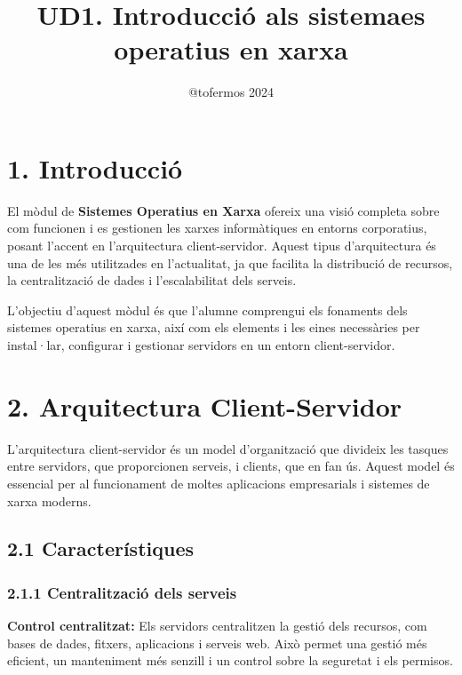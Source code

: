 \documentclass[
  a4paper,
]{article}
\title{UD1. Introducció als sistemaes operatius en xarxa}
\author{@tofermos 2024}
\date{}
\begin{document}
\maketitle

{
\setcounter{tocdepth}{2}
\tableofcontents
}
\newpage
\renewcommand\tablename{Tabla}

\section{1. Introducció}\label{introducciuxf3}

El mòdul de \textbf{Sistemes Operatius en Xarxa} ofereix una visió
completa sobre com funcionen i es gestionen les xarxes informàtiques en
entorns corporatius, posant l'accent en l'arquitectura client-servidor.
Aquest tipus d'arquitectura és una de les més utilitzades en
l'actualitat, ja que facilita la distribució de recursos, la
centralització de dades i l'escalabilitat dels serveis.

L'objectiu d'aquest mòdul és que l'alumne comprengui els fonaments dels
sistemes operatius en xarxa, així com els elements i les eines
necessàries per instal·lar, configurar i gestionar servidors en un
entorn client-servidor.

\section{2. Arquitectura
Client-Servidor}\label{arquitectura-client-servidor}

L'arquitectura client-servidor és un model d'organització que divideix
les tasques entre servidors, que proporcionen serveis, i clients, que en
fan ús. Aquest model és essencial per al funcionament de moltes
aplicacions empresarials i sistemes de xarxa moderns.

\subsection{2.1 Característiques}\label{caracteruxedstiques}

\subsubsection{2.1.1 Centralització dels
serveis}\label{centralitzaciuxf3-dels-serveis}

\textbf{Control centralitzat:} Els servidors centralitzen la gestió dels
recursos, com bases de dades, fitxers, aplicacions i serveis web. Això
permet una gestió més eficient, un manteniment més senzill i un control
sobre la seguretat i els permisos.
\end{document}
